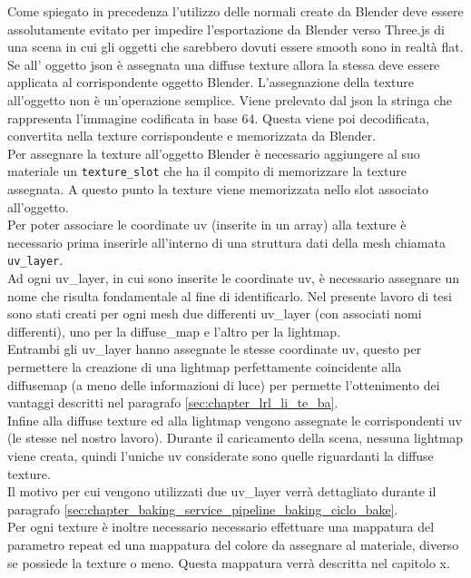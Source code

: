 Come spiegato in precedenza l’utilizzo delle normali create da Blender deve essere assolutamente evitato per impedire l’esportazione da Blender verso Three.js di una scena in cui gli oggetti che sarebbero dovuti essere smooth sono in realtà flat.
\\
Se all’ oggetto json è assegnata una diffuse texture allora la stessa deve essere applicata al corrispondente oggetto Blender. L’assegnazione della texture all’oggetto non è un’operazione semplice. 
Viene prelevato dal json la stringa che rappresenta l’immagine codificata in base 64. Questa viene poi decodificata, convertita nella texture corrispondente e memorizzata da Blender.
\\
Per assegnare la texture all’oggetto Blender è necessario aggiungere al suo materiale un \texttt{texture\_slot} che ha il compito di memorizzare la texture assegnata. 
A questo punto la texture viene memorizzata nello slot associato all’oggetto.
\\
Per poter associare le coordinate uv (inserite in un array) alla texture è necessario prima inserirle all’interno di una struttura dati della mesh chiamata \texttt{uv\_layer}.
\\
Ad ogni uv\_layer, in cui sono inserite le coordinate uv, è necessario assegnare un nome che risulta fondamentale al fine di identificarlo.
Nel presente lavoro di tesi sono stati creati per ogni mesh due differenti uv\_layer (con associati nomi differenti), uno per la diffuse\_map e l’altro per la lightmap.
\\
Entrambi gli uv\_layer hanno assegnate le stesse coordinate uv, questo per permettere la creazione di una lightmap perfettamente coincidente alla diffusemap (a meno delle informazioni di luce) per permette l’ottenimento dei vantaggi descritti nel paragrafo \ref{sec:chapter_lrl_li_te_ba}.
\\
Infine alla diffuse texture ed alla lightmap vengono assegnate le corrispondenti uv (le stesse nel nostro lavoro).
Durante il caricamento della scena, nessuna lightmap viene creata, quindi l’uniche uv considerate sono quelle riguardanti la diffuse texture.
\\
Il motivo per cui vengono utilizzati due uv\_layer verrà dettagliato durante il paragrafo \ref{sec:chapter_baking_service_pipeline_baking_ciclo_bake}.
\\
Per ogni texture è inoltre necessario necessario effettuare una mappatura del parametro repeat ed una mappatura del colore da assegnare al materiale, diverso se possiede la texture o meno. Questa mappatura verrà descritta nel capitolo x.

